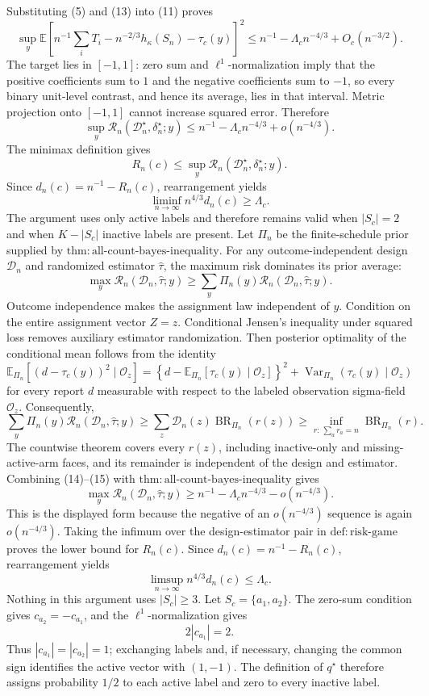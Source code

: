 Substituting (5) and (13) into (11) proves
\[
\sup_y\mathbb E\left[
n^{-1}\sum_iT_i-n^{-2/3}h_\kappa(S_n)-\tau_c(y)
\right]^2
\le n^{-1}-\Lambda_cn^{-4/3}+O_c(n^{-3/2}).
\]
The target lies in \([-1,1]\): zero sum and \(\ell^1\)-normalization imply that the positive coefficients sum to \(1\) and the negative coefficients sum to \(-1\), so every binary unit-level contrast, and hence its average, lies in that interval.  Metric projection onto \([-1,1]\) cannot increase squared error.  Therefore
\[
\sup_y\mathcal R_n(\mathcal D_n^\star,\delta_n^\star;y)
\le n^{-1}-\Lambda_cn^{-4/3}+o(n^{-4/3}).
\]
The minimax definition gives
\[
R_n(c)\le
\sup_y\mathcal R_n(\mathcal D_n^\star,\delta_n^\star;y).
\]
Since \(d_n(c)=n^{-1}-R_n(c)\), rearrangement yields
\[
\liminf_{n\to\infty}n^{4/3}d_n(c)\ge\Lambda_c.
\]
The argument uses only active labels and therefore remains valid when \(|S_c|=2\) and when \(K-|S_c|\) inactive labels are present.
Let \(\Pi_n\) be the finite-schedule prior supplied by
\(\mathrm{thm:all\text{-}count\text{-}bayes\text{-}inequality}\).
For any outcome-independent design \(\mathcal D_n\) and randomized estimator
\(\widehat\tau\), the maximum risk dominates its prior average:
\[
\max_y\mathcal R_n(\mathcal D_n,\widehat\tau;y)
\ge\sum_y\Pi_n(y)\mathcal R_n(\mathcal D_n,\widehat\tau;y).
\tag{14}
\]
Outcome independence makes the assignment law independent of \(y\).  Condition on the entire assignment vector \(Z=z\).  Conditional Jensen's inequality under squared loss removes auxiliary estimator randomization.  Then posterior optimality of the conditional mean follows from the identity
\[
\mathbb E_{\Pi_n}\!\left[(d-\tau_c(y))^2\mid\mathscr O_z\right]
=\left\{d-\mathbb E_{\Pi_n}[\tau_c(y)\mid\mathscr O_z]\right\}^2
+\operatorname{Var}_{\Pi_n}(\tau_c(y)\mid\mathscr O_z)
\]
for every report \(d\) measurable with respect to the labeled observation sigma-field \(\mathscr O_z\).  Consequently,
\[
\sum_y\Pi_n(y)\mathcal R_n(\mathcal D_n,\widehat\tau;y)
\ge\sum_z\mathcal D_n(z)\operatorname{BR}_{\Pi_n}(r(z))
\ge\inf_{r:\,\sum_ar_a=n}\operatorname{BR}_{\Pi_n}(r).
\tag{15}
\]
The countwise theorem covers every \(r(z)\), including inactive-only and missing-active-arm faces, and its remainder is independent of the design and estimator.  Combining (14)--(15) with
\(\mathrm{thm:all\text{-}count\text{-}bayes\text{-}inequality}\) gives
\[
\max_y\mathcal R_n(\mathcal D_n,\widehat\tau;y)
\ge n^{-1}-\Lambda_cn^{-4/3}-o(n^{-4/3}).
\]
This is the displayed form because the negative of an \(o(n^{-4/3})\) sequence is again \(o(n^{-4/3})\).  Taking the infimum over the design-estimator pair in
\(\mathrm{def:risk\text{-}game}\) proves the lower bound for \(R_n(c)\).  Since
\(d_n(c)=n^{-1}-R_n(c)\), rearrangement yields
\[
\limsup_{n\to\infty}n^{4/3}d_n(c)\le\Lambda_c.
\]
Nothing in this argument uses \(|S_c|\ge3\).
Let \(S_c=\{a_1,a_2\}\).  The zero-sum condition gives
\(c_{a_2}=-c_{a_1}\), and the \(\ell^1\)-normalization gives
\[
2|c_{a_1}|=2.
\]
Thus \(|c_{a_1}|=|c_{a_2}|=1\); exchanging labels and, if necessary, changing the common sign identifies the active vector with \((1,-1)\).  The definition of \(q^\star\) therefore assigns probability \(1/2\) to each active label and zero to every inactive label.

